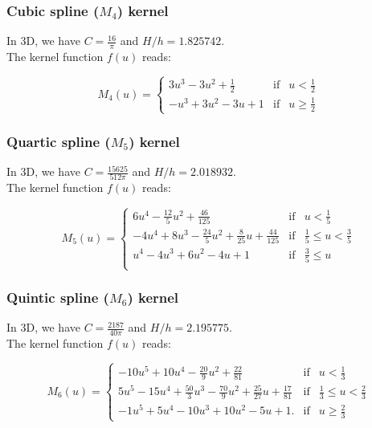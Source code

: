 \documentclass[a4paper]{mnras}
\begin{document}
\subsubsection{Cubic spline ($M_4$) kernel}

In 3D, we have $C=\frac{16}{\pi}$ and $H/h = 1.825742$.\\
The kernel function $f(u)$ reads:

\begin{equation}
  M_4(u) = \left\lbrace\begin{array}{rcl}
  3u^3 - 3u^2 + \frac{1}{2} & \mbox{if} & u<\frac{1}{2}\\
  -u^3 + 3u^2 - 3u + 1 & \mbox{if} & u \geq \frac{1}{2}
  \end{array}
  \right.
    \nonumber
\end{equation}


\subsubsection{Quartic spline ($M_5$) kernel}

In 3D, we have $C=\frac{15625}{512\pi}$ and $H/h = 2.018932$.\\
The kernel function $f(u)$ reads:

\begin{equation}
  M_5(u) = \left\lbrace\begin{array}{rcl}
  6u^4 - \frac{12}{5}u^2 + \frac{46}{125} & \mbox{if} & u < \frac{1}{5} \\
  -4u^4 + 8u^3  - \frac{24}{5}u^2 + \frac{8}{25}u + \frac{44}{125} &  \mbox{if} &  \frac{1}{5} \leq u < \frac{3}{5}\\
  u^4 - 4u^3 + 6u^2 - 4u + 1 &  \mbox{if} &  \frac{3}{5} \leq u \\
  \end{array}
  \right.
  \nonumber
\end{equation}


\subsubsection{Quintic spline ($M_6$) kernel}

In 3D, we have $C=\frac{2187}{40\pi}$ and $H/h = 2.195775$.\\
The kernel function $f(u)$ reads:

\begin{equation}
  M_6(u) = \left\lbrace\begin{array}{rcl}
  -10u^5 + 10u^4 - \frac{20}{9}u^2 + \frac{22}{81} & \mbox{if} & u < \frac{1}{3} \\
  5u^5 - 15u^4 + \frac{50}{3}u^3 - \frac{70}{9}u^2 + \frac{25}{27}u + \frac{17}{81} &  \mbox{if} &  \frac{1}{3} \leq u < \frac{2}{3}\\
  -1u^5 + 5u^4 - 10u^3 + 10u^2 - 5u + 1. & \mbox{if} & u \geq \frac{2}{3}
  \end{array}
  \right.
    \nonumber
\end{equation}
\end{document}
